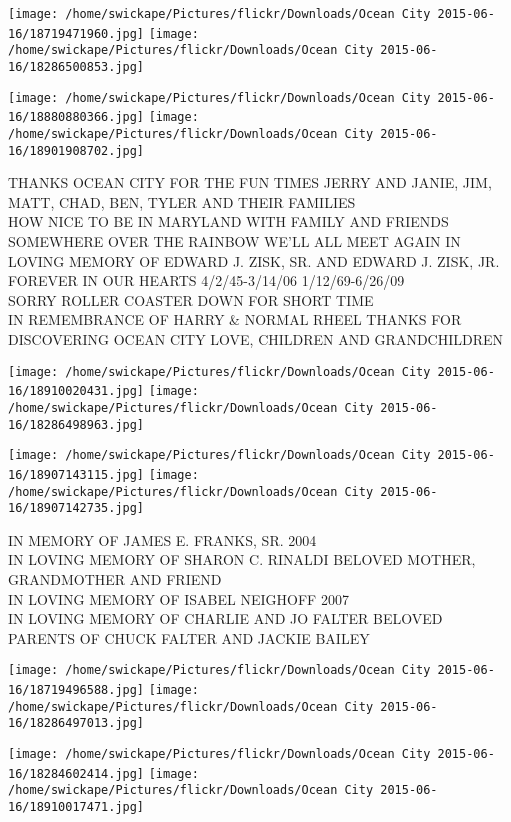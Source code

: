 \documentclass[10pt,letterpaper]{article}
\begin{document}
\texttt{[image: /home/swickape/Pictures/flickr/Downloads/Ocean City 2015-06-16/18719471960.jpg]}
\texttt{[image: /home/swickape/Pictures/flickr/Downloads/Ocean City 2015-06-16/18286500853.jpg]}

\texttt{[image: /home/swickape/Pictures/flickr/Downloads/Ocean City 2015-06-16/18880880366.jpg]}
\texttt{[image: /home/swickape/Pictures/flickr/Downloads/Ocean City 2015-06-16/18901908702.jpg]}

THANKS OCEAN CITY FOR THE FUN TIMES JERRY AND JANIE, JIM, MATT, CHAD, BEN, TYLER AND THEIR FAMILIES\\
HOW NICE TO BE IN MARYLAND WITH FAMILY AND FRIENDS SOMEWHERE OVER THE RAINBOW WE'LL ALL MEET AGAIN IN LOVING MEMORY OF EDWARD J. ZISK, SR. AND EDWARD J. ZISK, JR. FOREVER IN OUR HEARTS 4/2/45{-}3/14/06 1/12/69{-}6/26/09\\
SORRY ROLLER COASTER DOWN FOR SHORT TIME\\
IN REMEMBRANCE OF HARRY \& NORMAL RHEEL THANKS FOR DISCOVERING OCEAN CITY LOVE, CHILDREN AND GRANDCHILDREN\\
\pagebreak

\texttt{[image: /home/swickape/Pictures/flickr/Downloads/Ocean City 2015-06-16/18910020431.jpg]}
\texttt{[image: /home/swickape/Pictures/flickr/Downloads/Ocean City 2015-06-16/18286498963.jpg]}

\texttt{[image: /home/swickape/Pictures/flickr/Downloads/Ocean City 2015-06-16/18907143115.jpg]}
\texttt{[image: /home/swickape/Pictures/flickr/Downloads/Ocean City 2015-06-16/18907142735.jpg]}

IN MEMORY OF JAMES E. FRANKS, SR. 2004\\
IN LOVING MEMORY OF SHARON C. RINALDI BELOVED MOTHER, GRANDMOTHER AND FRIEND\\
IN LOVING MEMORY OF ISABEL NEIGHOFF 2007\\
IN LOVING MEMORY OF CHARLIE AND JO FALTER BELOVED PARENTS OF CHUCK FALTER AND JACKIE BAILEY\\
\pagebreak

\texttt{[image: /home/swickape/Pictures/flickr/Downloads/Ocean City 2015-06-16/18719496588.jpg]}
\texttt{[image: /home/swickape/Pictures/flickr/Downloads/Ocean City 2015-06-16/18286497013.jpg]}

\texttt{[image: /home/swickape/Pictures/flickr/Downloads/Ocean City 2015-06-16/18284602414.jpg]}
\texttt{[image: /home/swickape/Pictures/flickr/Downloads/Ocean City 2015-06-16/18910017471.jpg]}
\end{document}
